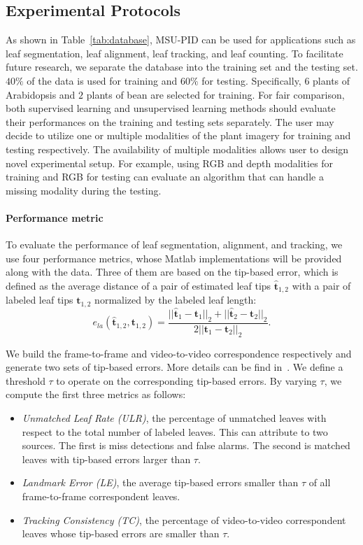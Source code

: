 \subsection{Experimental Protocols}
As shown in Table~\ref{tab:database}, MSU-PID can be used for applications such as leaf segmentation, leaf alignment, leaf tracking, and leaf counting.
To facilitate future research, we separate the database into the training set and the testing set.
$40\%$ of the data is used for training and $60\%$ for testing.
Specifically, $6$ plants of Arabidopsis and $2$ plants of bean are selected for training.
For fair comparison, both supervised learning and unsupervised learning methods should evaluate their performances on the training and testing sets separately.
The user may decide to utilize one or multiple modalities of the plant imagery for training and testing respectively.
The availability of multiple modalities allows user to design novel experimental setup.
For example, using RGB and depth modalities for training and RGB for testing can evaluate an algorithm that can handle a missing modality during the testing.



\paragraph{Performance metric}
To evaluate the performance of leaf segmentation, alignment, and tracking, we use four performance metrics, whose Matlab implementations will be provided along with the data.
Three of them are based on the tip-based error, which is defined as the average distance of a pair of estimated leaf tips $\hat{\bm{t}}_{1,2}$ with a pair of labeled leaf tips $ \bm{t}_{1,2}$ normalized by the labeled leaf length:
\begin {equation}
e_{la}(\hat{\bm{t}}_{1,2}, \bm{t}_{1,2}) = \frac{||\hat{\bm{t}}_1-{\bm{t}}_1||_2 + ||\hat{\bm{t}}_2-{\bm{t}}_2||_2}{2 ||\bm{t}_1-\bm{t}_2||_2}.
\label{eqn:tipError}
\end{equation}

We build the frame-to-frame and video-to-video correspondence respectively and generate two sets of tip-based errors.
More details can be find in~\cite{yin2015}.
We define a threshold $\tau$ to operate on the corresponding tip-based errors.
By varying $\tau$, we compute the first three metrics as follows:
\begin{itemize}
\item {\it{Unmatched Leaf Rate (ULR)}}, the percentage of unmatched leaves with respect to the total number of labeled leaves.
This can attribute to two sources.
The first is miss detections and false alarms.
The second is matched leaves with tip-based errors larger than $\tau$.
\item {\it{Landmark Error (LE)}}, the average tip-based errors smaller than $\tau$ of all frame-to-frame correspondent leaves.
\item {\it{Tracking Consistency (TC)}}, the percentage of video-to-video correspondent leaves whose tip-based errors are smaller than $\tau$.
\end{itemize}

